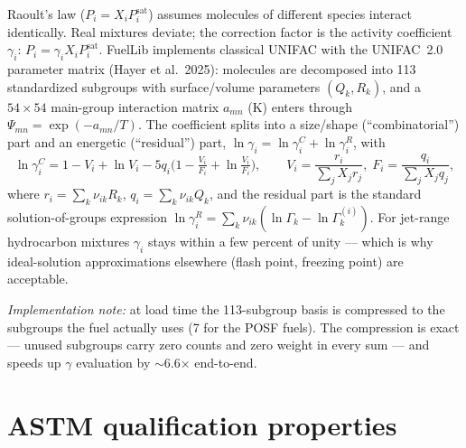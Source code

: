 \documentclass[11pt]{article}
\begin{document}
Raoult's law ($P_i = X_i P_i^{\mathrm{sat}}$) assumes molecules of
different species interact identically. Real mixtures deviate; the
correction factor is the activity coefficient $\gamma_i$:
$P_i = \gamma_i X_i P_i^{\mathrm{sat}}$. FuelLib implements classical
UNIFAC with the UNIFAC~2.0 parameter matrix (Hayer et al.\ 2025):
molecules are decomposed into 113 standardized subgroups with surface/volume
parameters $(Q_k, R_k)$, and a $54\times54$ main-group interaction matrix
$a_{mn}$ (\si{K}) enters through
$\Psi_{mn} = \exp(-a_{mn}/T)$. The coefficient splits into a
size/shape (``combinatorial'') part and an energetic (``residual'') part,
$\ln\gamma_i = \ln\gamma_i^{C} + \ln\gamma_i^{R}$, with
\begin{equation}
  \ln \gamma^C_i = 1 - V_i + \ln V_i
    - 5 q_i \Big( 1 - \tfrac{V_i}{F_i} + \ln \tfrac{V_i}{F_i} \Big),
  \qquad
  V_i = \frac{r_i}{\sum_j X_j r_j},\;
  F_i = \frac{q_i}{\sum_j X_j q_j},
\end{equation}
where $r_i = \sum_k \nu_{ik} R_k$, $q_i = \sum_k \nu_{ik} Q_k$, and the
residual part is the standard solution-of-groups expression
$\ln\gamma^R_i = \sum_k \nu_{ik} (\ln\Gamma_k - \ln\Gamma_k^{(i)})$.
For jet-range hydrocarbon mixtures $\gamma_i$ stays within a few percent of
unity --- which is why ideal-solution approximations elsewhere (flash point,
freezing point) are acceptable.

\emph{Implementation note:} at load time the 113-subgroup basis is
compressed to the subgroups the fuel actually uses (7 for the POSF fuels).
The compression is exact --- unused subgroups carry zero counts and zero
weight in every sum --- and speeds up $\gamma$ evaluation by
$\sim$6.6$\times$ end-to-end.

\section{ASTM qualification properties}
\end{document}
